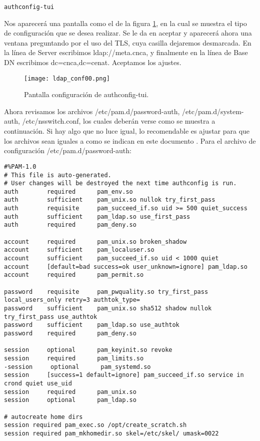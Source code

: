 \begin{lstlisting} 
authconfig-tui
\end{lstlisting}
Nos aparecerá una pantalla como el de la figura \ref{fig:ldapconf:00}, en la cual se muestra el tipo de configuración que se desea realizar. Se le da en aceptar y aparecerá ahora una ventana preguntando por el uso del TLS, cuya casilla dejaremos desmarcada. En la línea de Server escribimos ldap://meta.cnca, y finalmente en la línea de Base DN escribimos dc=cnca,dc=cenat. Aceptamos los ajustes.
\begin{figure}[H]
\centering
\texttt{[image: ldap\_conf00.png]}
\caption{Pantalla configuración de authconfig-tui.}
\label{fig:ldapconf:00}
\end{figure}
Ahora revisamos los archivos /etc/pam.d/password-auth, /etc/pam.d/system-auth, /etc/nsswitch.conf, los cuales deberán verse como se muestra a continuación. Si hay algo que no luce igual, lo recomendable es ajustar para que los archivos sean iguales a como se indican en este documento \cite{ldapserver}.
Para el archivo de configuración /etc/pam.d/password-auth:
\begin{lstlisting} 
#%PAM-1.0
# This file is auto-generated.
# User changes will be destroyed the next time authconfig is run.
auth        required      pam_env.so
auth        sufficient    pam_unix.so nullok try_first_pass
auth        requisite     pam_succeed_if.so uid >= 500 quiet_success
auth        sufficient    pam_ldap.so use_first_pass
auth        required      pam_deny.so

account     required      pam_unix.so broken_shadow
account     sufficient    pam_localuser.so
account     sufficient    pam_succeed_if.so uid < 1000 quiet
account     [default=bad success=ok user_unknown=ignore] pam_ldap.so
account     required      pam_permit.so

password    requisite     pam_pwquality.so try_first_pass local_users_only retry=3 authtok_type=
password    sufficient    pam_unix.so sha512 shadow nullok try_first_pass use_authtok
password    sufficient    pam_ldap.so use_authtok
password    required      pam_deny.so

session     optional      pam_keyinit.so revoke
session     required      pam_limits.so
-session     optional      pam_systemd.so
session     [success=1 default=ignore] pam_succeed_if.so service in crond quiet use_uid
session     required      pam_unix.so
session     optional      pam_ldap.so

# autocreate home dirs
session required pam_exec.so /opt/create_scratch.sh
session required pam_mkhomedir.so skel=/etc/skel/ umask=0022
\end{lstlisting}
